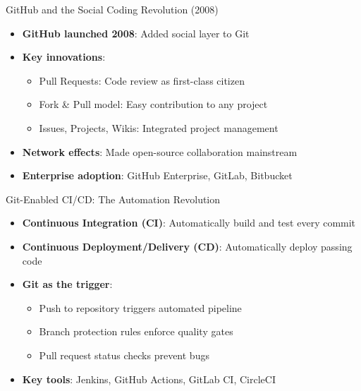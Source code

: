 \documentclass{beamer}
\begin{document}
\begin{frame}[t]{GitHub and the Social Coding Revolution (2008)}
\begin{itemize}
    \item \textbf{GitHub launched 2008}: Added social layer to Git
    \item \textbf{Key innovations}:
        \begin{itemize}
            \item Pull Requests: Code review as first-class citizen
            \item Fork \& Pull model: Easy contribution to any project
            \item Issues, Projects, Wikis: Integrated project management
        \end{itemize}
    \item \textbf{Network effects}: Made open-source collaboration mainstream
    \item \textbf{Enterprise adoption}: GitHub Enterprise, GitLab, Bitbucket
\end{itemize}
\end{frame}

\begin{frame}[t]{Git-Enabled CI/CD: The Automation Revolution}
\begin{itemize}
    \item \textbf{Continuous Integration (CI)}: Automatically build and test every commit
    \item \textbf{Continuous Deployment/Delivery (CD)}: Automatically deploy passing code
    \item \textbf{Git as the trigger}: 
        \begin{itemize}
            \item Push to repository triggers automated pipeline
            \item Branch protection rules enforce quality gates
            \item Pull request status checks prevent bugs
        \end{itemize}
    \item \textbf{Key tools}: Jenkins, GitHub Actions, GitLab CI, CircleCI
\end{itemize}

\end{frame}
\end{document}
